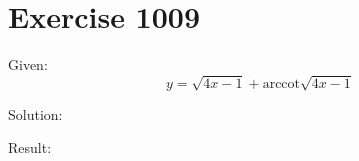 \documentclass[a4paper, 10pt]{scrartcl}
\newcommand*\arccot{\mathrm{arccot}}
\begin{document}
\section{Exercise 1009}

Given:
\[
y = \sqrt{4x - 1} + \arccot{\sqrt{4x - 1}}
\]

Solution:

Result:
\end{document}
